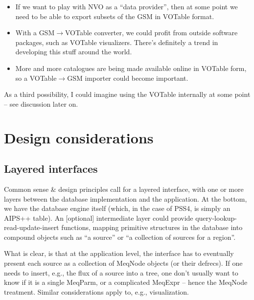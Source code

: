 \documentclass[]{lofar}
\begin{document}
  \begin{itemize}
  
  \item If we want to play with NVO as a ``data provider'', then at some point we
  need to be able to export subsets of the GSM in VOTable format. 
  
  \item With a GSM$\rightarrow$VOTable converter, we could profit from outside
  software packages, such as VOTable visualizers. There's definitely a trend in
  developing this stuff around the world.
  
  \item More and more catalogues are being made available online in VOTable form,
  so a VOTable$\rightarrow$GSM importer could become important.
  
  \end{itemize}
  
  As a third possibility, I could imagine using the VOTable internally at some
  point -- see discussion later on.
  
\section{Design considerations}
  
\subsection{Layered interfaces}
  
  Common sense \& design principles call for a layered interface, with one or
  more layers between the database implementation  and the application. At the
  bottom, we have the database engine itself (which, in the case of PSS4, is
  simply an AIPS++ table). An [optional] intermediate layer could provide
  query-lookup-read-update-insert functions, mapping primitive structures in the
  database into compound objects such as ``a source'' or ``a collection of sources
  for a region''. 
  
  What is clear, is that at the application level, the interface has to
  eventually present each source as a collection of MeqNode objects (or their
  defrecs). If one needs to insert, e.g., the flux of a source into a tree, one 
  don't usually want to know if it is a single MeqParm, or a complicated MeqExpr
  -- hence the MeqNode treatment. Similar considerations apply to, e.g.,
  visualization. 
  
\end{document}
